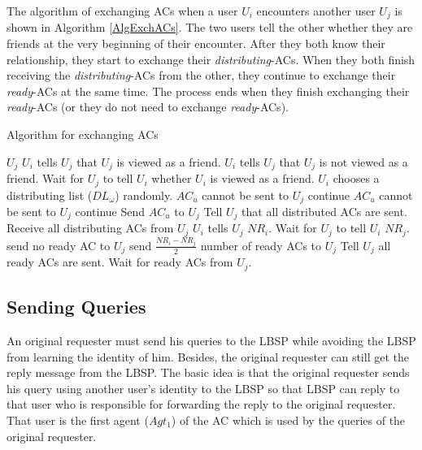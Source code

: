 The algorithm of exchanging ACs when a user $U_i$ encounters another user $U_j$ is shown in Algorithm \ref{AlgExchACs}. The two users tell the other whether they are friends at the very beginning of their encounter. After they both know their relationship, they start to exchange their \textit{distributing}-ACs. When they both finish receiving the \textit{distributing}-ACs from the other, they continue to exchange their \textit{ready}-ACs at the same time. The process ends when they finish exchanging their \textit{ready}-ACs (or they do not need to exchange \textit{ready}-ACs).

\begin{algorithm} [hbtp]
\caption{Algorithm for exchanging ACs}\label{AlgExchACs}
\begin{algorithmic}[1]
 {$U_j$}
	\State $U_i$ tells $U_j$ that $U_j$ is viewed as a friend.
\Else
	\State $U_i$ tells $U_j$ that $U_j$ is not viewed as a friend.
\EndIf
\State Wait for $U_j$ to tell $U_i$ whether $U_i$ is viewed as a friend.
\State $U_i$ chooses a distributing list (${DL}_{\omega}$) randomly.
		\State ${AC}_u$ cannot be sent to $U_j$
		\State continue
	\EndIf
			\State ${AC}_u$ cannot be sent to $U_j$
			\State continue
		\EndIf
	\EndIf
	\State Send ${AC}_u$ to $U_j$
\EndFor
\State Tell $U_j$ that all distributed ACs are sent.
\State Receive all distributing ACs from $U_j$
	\State $U_i$ tells $U_j$ ${NR}_i$.
\EndIf
{}
	\State Wait for $U_j$ to tell $U_i$ ${NR}_j$.
		\State send no ready AC to $U_j$
	\Else
		\State send $\frac{{NR}_i-{NR}_j}{2}$ number of ready ACs to $U_j$
	\EndIf
	\State Tell $U_j$ all ready ACs are sent.
\EndIf
{}
	\State Wait for ready ACs from $U_j$.
\EndIf 
\EndProcedure

\end{algorithmic}
\end{algorithm}

\subsection{ Sending Queries}

\noindent An original requester must send his queries to the LBSP while avoiding the LBSP from learning the identity of him. Besides, the original requester can still get the reply message from the LBSP. The basic idea is that the original requester sends his query using another user's identity to the LBSP so that LBSP can reply to that user who is responsible for forwarding the reply to the original requester. That user is the first agent ($Agt_1$) of the AC which is used by the queries of the original requester.


